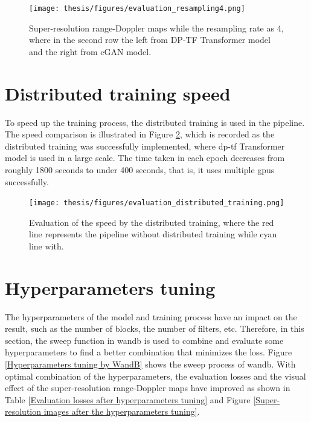 \begin{figure}[!htp]
    \centering
    \texttt{[image: thesis/figures/evaluation\_resampling4.png]}
    \caption{Super-resolution range-Doppler maps while the resampling rate as 4, where in the second row the left from DP-TF Transformer model and the right from cGAN model.}
    \label{Super-resolution images while the resampling rate as 4}
\end{figure}

\section{Distributed training speed} \label{Distributed training evaluation}
To speed up the training process, the distributed training is used in the pipeline. The speed comparison is illustrated in Figure \ref{Evaluation of the speed by the distributed training}, which is recorded as the distributed training was successfully implemented, where \gls{dp}-\gls{tf} Transformer model is used in a large scale. The time taken in each epoch decreases from roughly 1800 seconds to under 400 seconds, that is, it uses multiple \gls{gpu}s successfully.


\begin{figure}[!htp]
    \centering
    \texttt{[image: thesis/figures/evaluation\_distributed\_training.png]}
    \caption{Evaluation of the speed by the distributed training, where the red line represents the pipeline without distributed training while cyan line with.}
    \label{Evaluation of the speed by the distributed training}
\end{figure}


\section{Hyperparameters tuning} \label{hyperparameters tuning evaluation}
The hyperparameters of the model and training process have an impact on the result, such as the number of blocks, the number of filters, etc. Therefore, in this section, the sweep function in \gls{wandb} is used to combine and evaluate some hyperparameters to find a better combination that minimizes the loss. Figure \ref{Hyperparameters tuning by WandB} shows the sweep process of \gls{wandb}. With optimal combination of the hyperparameters, the evaluation losses and the visual effect of the super-resolution range-Doppler maps have improved as shown in Table \ref{Evaluation losses after hyperparameters tuning} and Figure \ref{Super-resolution images after the hyperparameters tuning}.


